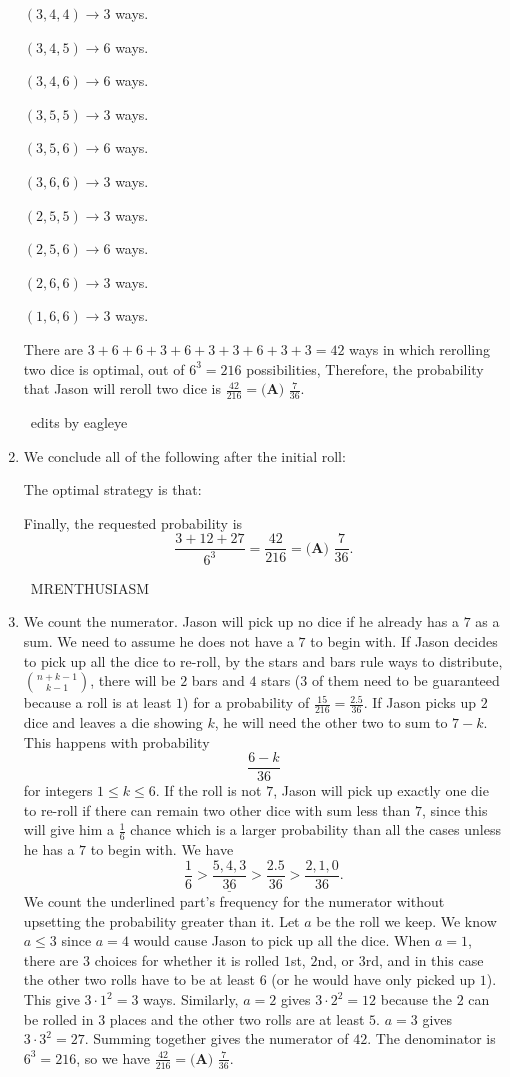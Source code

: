 \documentclass{article}%
\begin{document}
\begin{enumerate}
$(3, 4, 4) \rightarrow 3$ ways.

$(3, 4, 5) \rightarrow 6$ ways.

$(3, 4, 6) \rightarrow 6$ ways.

$(3, 5, 5) \rightarrow 3$ ways.

$(3, 5, 6) \rightarrow 6$ ways.

$(3, 6, 6) \rightarrow 3$ ways.

$(2, 5, 5) \rightarrow 3$ ways.

$(2, 5, 6) \rightarrow 6$ ways.

$(2, 6, 6) \rightarrow 3$ ways.

$(1, 6, 6) \rightarrow 3$ ways.

There are $3 + 6 + 6 + 3 + 6 + 3 + 3 + 6 + 3 + 3 = 42$ ways in which rerolling two dice is optimal, out of $6^3 = 216$ possibilities, Therefore, the probability that Jason will reroll two dice is $\frac{42}{216} = \boxed{\textbf{(A) } \frac{7}{36}}$.

~edits by eagleye

%
\item%
We conclude all of the following after the initial roll:

The optimal strategy is that:

Finally, the requested probability is \[\frac{3+12+27}{6^3}=\frac{42}{216}=\boxed{\textbf{(A) } \frac{7}{36}}.\]

~MRENTHUSIASM

%
\item%
We count the numerator.
Jason will pick up no dice if he already has a $7$ as a sum. We need to assume he does not have a $7$ to begin with.
If Jason decides to pick up all the dice to re-roll, by the stars and bars rule ways to distribute, ${n+k-1 \choose k-1}$, there will be $2$ bars and $4$ stars ($3$ of them need to be guaranteed because a roll is at least $1$) for a probability of $\frac{15}{216}=\frac{2.5}{36}$.
If Jason picks up $2$ dice and leaves a die showing $k$, he will need the other two to sum to $7-k$. This happens with probability \[\frac{6-k}{36}\] for integers $1 \leq k \leq 6$.
If the roll is not $7$, Jason will pick up exactly one die to re-roll if there can remain two other dice with sum less than $7$, since this will give him a $\frac{1}{6}$ chance which is a larger probability than all the cases unless he has a $7$ to begin with.
We have \[\frac{1}{6} > \underline{\frac{5,4,3}{36}} > \frac{2.5}{36} > \frac{2,1,0}{36}.\]
We count the underlined part's frequency for the numerator without upsetting the probability greater than it.
Let $a$ be the roll we keep. We know $a\leq3$ since $a=4$ would cause Jason to pick up all the dice.
When $a=1$, there are $3$ choices for whether it is rolled $1$st, $2$nd, or $3$rd, and in this case the other two rolls have to be at least $6$ (or he would have only picked up $1$). This give $3 \cdot 1^{2} =3$ ways.
Similarly, $a=2$ gives $3 \cdot 2^{2} =12$ because the $2$ can be rolled in $3$ places and the other two rolls are at least $5$.
$a=3$ gives $3 \cdot 3^{2} =27$. 
Summing together gives the numerator of $42$.
The denominator is $6^3=216$, so we have $\frac{42}{216}=\boxed{\textbf{(A) } \frac{7}{36}}$.


\end{enumerate}
\end{document}

